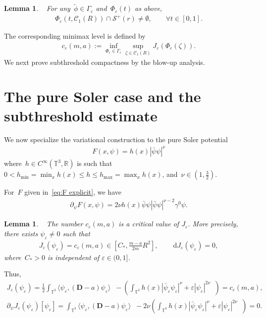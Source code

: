 \documentclass[11pt,final]{amsart}
\newcommand{\R}{\mathbb{R}}
\newcommand{\T}{\mathbb{T}}
\newcommand{\dd}{\mathop{}\!\mathrm{d}}
\newcommand{\eps}{\varepsilon}
\newcommand{\p}{\partial}
\newcommand{\pD}{\mathbf{D}}
\DeclareMathOperator{\dv}{\dd{vol}}
\newtheorem{lemma}[thm]{Lemma}
\begin{document}
\begin{lemma}\label{lemma:intersection}~\cite[Lemma 4.6]{WZ2026Stationary}
    For any~$\tilde{\phi}\in \Gamma_\eps$ and~$\Phi_\eps(t)$ as above,
    \begin{align}
        \Phi_\eps(t,\mathscr{C}_1(R))\cap \mathscr{S}^+(r)\neq \emptyset,\qquad \forall t\in [0,1].
    \end{align}
\end{lemma}

The corresponding minimax level is defined by 
\begin{align}
c_\eps(m,a)
:=
\inf_{\Phi_\eps\in\Gamma_\eps}
\sup_{\zeta\in\mathscr C_1(R)}
J_\eps(\Phi_\eps(\zeta)).
\end{align}
We next prove subthreshold compactness by the blow-up analysis. 







\section{The pure Soler case and the subthreshold estimate}\label{sect:example}

We now specialize the variational construction to the pure
Soler potential
\begin{align}\label{eq:F explicit}
    F(x,\psi)= h(x)|\bar{\psi}\psi|^{\nu}
\end{align}
where~$h\in C^\infty(\T^3,\R)$ is such that~$0<h_{\min}=\min_{x}h(x)\leq h\leq h_{\max}=\max_{x}h(x)$, and~$\nu\in (1,\frac{3}{2})$.




For~$F$ given in~\eqref{eq:F explicit}, we have
\begin{align}
    \p_\psi F(x,\psi)=2\nu h(x)\bar{\psi}\psi|\bar{\psi}\psi|^{\nu-2}\gamma^0\psi.
\end{align}
\begin{lemma}~\cite[Section 4.3]{WZ2026Stationary}
The number $c_\eps(m,a)$ is a critical value of $J_\eps$. More precisely, there exists $\psi_\eps\ne0$ such that
\begin{align}
    J_\eps (\psi_\eps) = c_\eps(m,a)\in [C_*,\frac{m-a}{2m}R^2], & & 
    \dd J_\eps(\psi_\eps)=0, 
\end{align}
where~$C_*>0$ is independent of $\eps\in(0,1]$.
\end{lemma}
Thus,
\begin{align}
    J_\eps(\psi_\eps)
=\frac12\int_{\T^3}
\langle\psi_\eps,(\pD-a)\psi_\eps\rangle\dv
-\left(\int_{\T^3} h(x)|\bar\psi_\eps\psi_\eps|^{\nu}
+\eps|\psi_\eps|^{2\nu}
\dv\right)= c_\eps(m,a),
\end{align}
\begin{align}
    \partial_\psi J_\eps(\psi_\eps)[\psi_\eps]
=\int_{\T^3}
\langle\psi_\eps,(\pD-a)\psi_\eps\rangle\dv
-2\nu\left(\int_{\T^3} h(x)|\bar\psi_\eps\psi_\eps|^{\nu}
+\eps|\psi_\eps|^{2\nu}
\dv\right)=0.
\end{align}
\end{document}
